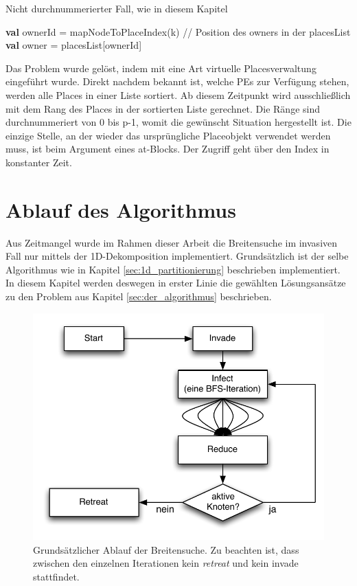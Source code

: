 \begin{algorithm}
	\caption{Nicht durchnummerierter Fall, wie in diesem Kapitel}
	\label{alg:owner_random}
	\begin{algorithmic}[1]
		\State \textbf{val} ownerId = mapNodeToPlaceIndex(k) // Position des owners in der placesList
		\State \textbf{val} owner   = placesList[ownerId]
	\end{algorithmic}
\end{algorithm}

Das Problem wurde gelöst, indem mit eine Art virtuelle Placesverwaltung eingeführt wurde. Direkt nachdem bekannt ist, welche PEs zur Verfügung stehen, werden alle Places in einer Liste sortiert. Ab diesem Zeitpunkt wird ausschließlich mit dem Rang des Places in der sortierten Liste gerechnet. Die Ränge sind durchnummeriert von 0 bis p-1, womit die gewünscht Situation hergestellt ist. Die einzige Stelle, an der wieder das ursprüngliche Placeobjekt verwendet werden muss, ist beim Argument eines at{}-Blocks. Der Zugriff geht  über den Index in konstanter Zeit.

\section{Ablauf des Algorithmus} %
\label{sec:ablauf_des_algorithmus}
Aus Zeitmangel wurde im Rahmen dieser Arbeit die Breitensuche im invasiven Fall nur mittels der 1D-Dekomposition implementiert. Grundsätzlich ist der selbe Algorithmus wie in Kapitel \ref{sec:1d_partitionierung} beschrieben implementiert. In diesem Kapitel werden deswegen in erster Linie die gewählten Lösungsansätze zu den Problem aus Kapitel \ref{sec:der_algorithmus} beschrieben.
\begin{figure}[ht]
	\centering
	\label{img:invasive-flow}
	\includegraphics{pics/invasive-flow.pdf}
	\caption{Grundsätzlicher Ablauf der Breitensuche. Zu beachten ist, dass zwischen den einzelnen Iterationen kein \textit{retreat} und kein invade stattfindet.}
\end{figure}

